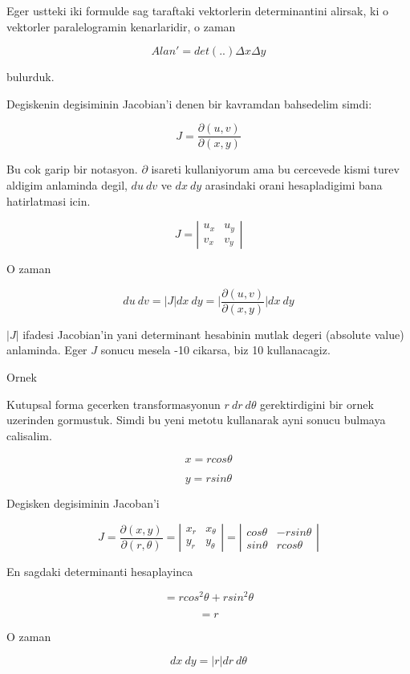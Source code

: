 \documentclass[12pt,fleqn]{article}\usepackage{../common}
\begin{document}
Eger ustteki iki formulde sag taraftaki vektorlerin determinantini alirsak,
ki o vektorler paralelogramin kenarlaridir, o zaman 

\[ Alan' =  det(..)\Delta x \Delta y  \]

bulurduk. 

Degiskenin degisiminin Jacobian'i denen bir kavramdan bahsedelim simdi: 

\[ J = \frac{\partial (u,v)}{\partial(x,y)} \]

Bu cok garip bir notasyon. $\partial$ isareti kullaniyorum ama bu cercevede
kismi turev aldigim anlaminda degil, $du \ dv$ ve $dx \ dy$ arasindaki
orani hesapladigimi bana hatirlatmasi icin. 

\[ J =  \left|\begin{array}{rr}
u_x & u_y \\
v_x & v_y
\end{array}\right|
\]

O zaman 

\[ du \ dv = 
|J| dx \ dy = 
\bigg|\frac{\partial (u,v)}{\partial(x,y)}\bigg| dx \ dy
 \]

$|J|$ ifadesi Jacobian'in yani determinant hesabinin mutlak degeri (absolute
value) anlaminda. Eger $J$ sonucu mesela -10 cikarsa, biz 10 kullanacagiz. 

Ornek 

Kutupsal forma gecerken transformasyonun $r \ dr \ d\theta$ gerektirdigini
bir ornek uzerinden gormustuk. Simdi bu yeni metotu kullanarak ayni sonucu
bulmaya calisalim. 

\[  x= r cos\theta \]

\[  y= r sin\theta \]

Degisken degisiminin Jacoban'i

\[ J = \frac{\partial (x,y)}{\partial(r,\theta)}  =
\left|\begin{array}{rr}
x_r & x_\theta \\
y_r & y_\theta
\end{array}\right|   =
\left|\begin{array}{rr}
cos\theta & -rsin\theta\\
sin\theta & rcos\theta
\end{array}\right|
\]

En sagdaki determinanti hesaplayinca

\[ = rcos^2\theta + rsin^2\theta \]

\[ = r \]

O zaman 

\[ dx \ dy = |r| dr \ d\theta \]
\end{document}
